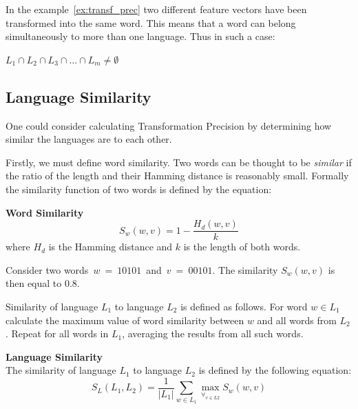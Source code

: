 \documentclass{mini}
\newcommand{\wordSim}[2]{
    S_{w}(#1,#2)
}
\newcommand{\lanSim}[2]{
    S_{L}(#1,#2)
}
\begin{document}
In the example~\ref{ex:transf_prec} two different feature vectors have been transformed into the same word. This means that a word can belong simultaneously to more than one language. Thus in such a case:
\begin{center}
    $L_{1} \cap L_{2} \cap L_{3} \cap \ldots \cap L_{m} \neq \emptyset$
\end{center}

\subsection{Language Similarity}\label{sec:lan_theory_lan_sim}
One could consider calculating Transformation Precision by determining how similar the languages are to each other.

Firstly, we must define word similarity. Two words can be thought to be \textit{similar} if the ratio of the length and their Hamming distance is reasonably small. Formally the similarity function of two words is defined by the equation:

\begin{definition} {\bf Word Similarity}
    \begin{equation}
    \wordSim{w}{v} = 1 - \frac{H_d(w,v)}{k}
    \end{equation}
    where $H_d$ is the Hamming distance and $k$ is the length of both words.
\end{definition}

Consider two words~$w~=~10101$~and~$v~=~00101$. The similarity $\wordSim{w}{v}$ is then equal to $0.8$.

Similarity of language $L_{1}$ to language $L_{2}$ is defined as follows. For word $w \in L_{1}$ calculate the maximum value of word similarity between $w$ and all words from $L_{2}$. Repeat for all words in $L_{1}$, averaging the results from all such words.

\begin{definition} {\bf Language Similarity\\}
The similarity of language $L_{1}$ to language $L_{2}$ is defined by the following equation:
    \begin{equation}
    \lanSim{L_{1}}{L_{2}} = \frac{1}{|L_{1}|} \sum_{w \in L_{1}} \max_{\forall_{v \in L{2}}} \wordSim{w}{v}
    \end{equation}

\end{definition}
\end{document}
